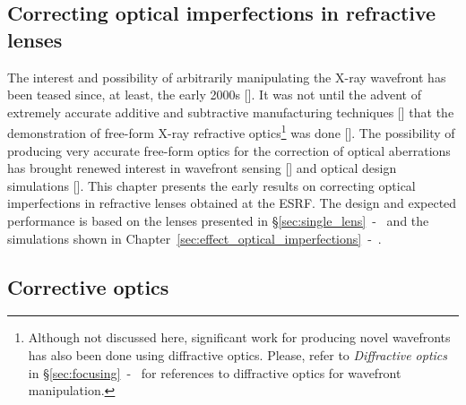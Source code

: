 
\begin{refsection}
\chapter{Correcting optical imperfections in refractive lenses}\label{sec:corrections}

The interest and possibility of arbitrarily manipulating the X-ray wavefront has been teased since, at least, the early 2000s [\cite{Chubar1999, Chubar2001b}]. It was not until the advent of extremely accurate additive and subtractive manufacturing techniques [\cite{Stohr2015, Polikarpov2016, Petrov2017, Roth2018, Sanli2018, Seiboth2019, Abrashitova2020, Antipov2020, Lin2020, Medvedskaya2020}] that the demonstration of free-form X-ray refractive optics\footnote{Although not discussed here, significant work for producing novel wavefronts has also been done using diffractive optics. Please, refer to \textit{Diffractive optics} in \S\ref{sec:focusing}~-~\textit{} for references to diffractive optics for wavefront manipulation.} was done [\cite{Sawhney2016,Seiboth2017,Laundy2019, Seiboth2020, Dhamgaye2020}]. The possibility of producing very accurate free-form optics for the correction of optical aberrations has brought renewed interest in wavefront sensing [\cite{Berujon2015, Seaberg2019}] and optical design simulations [\cite{Laundy2020}]. This chapter presents the early results on correcting optical imperfections in refractive lenses obtained at the ESRF. The design and expected performance is based on the lenses presented in \S\ref{sec:single_lens}~-~\textit{} and the simulations shown in Chapter~\ref{sec:effect_optical_imperfections}~-~\textit{}.

\section{Corrective optics}\label{sec:corrective_optics}


\end{refsection}
